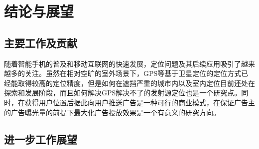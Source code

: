 \chapter{结论与展望}
\label{cha:conclusion}

\section{主要工作及贡献}

随着智能手机的普及和移动互联网的快速发展，定位问题及其后续应用吸引了越来越多的关注。虽然在相对空旷的室外场景下，GPS等基于卫星定位的定位方式已经能取得较高的定位精度，但是如何在遮挡严重的城市内以及室内定位目前还处在探索和发展阶段，而且如何解决GPS解决不了的发射源定位也是一个研究点。同时，在获得用户位置后据此向用户推送广告是一种可行的商业模式，在保证广告主的广告曝光量的前提下最大化广告投放效果是一个有意义的研究方向。

\section{进一步工作展望}



